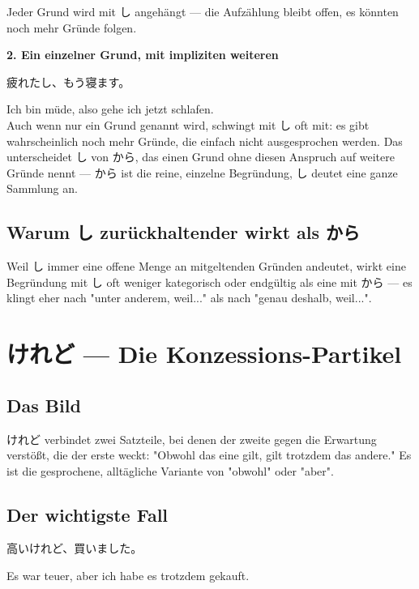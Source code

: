 \documentclass[12pt]{book}
\begin{document}
Jeder Grund wird mit し angehängt — die Aufzählung bleibt offen, es könnten noch mehr Gründe folgen.

\textbf{2. Ein einzelner Grund, mit impliziten weiteren}
\par\quad 疲れたし、もう寝ます。\\
\par\quad Ich bin müde, also gehe ich jetzt schlafen.\\

Auch wenn nur ein Grund genannt wird, schwingt mit し oft mit: es gibt wahrscheinlich noch mehr Gründe, die einfach nicht ausgesprochen werden. Das unterscheidet し von から, das einen Grund ohne diesen Anspruch auf weitere Gründe nennt — から ist die reine, einzelne Begründung, し deutet eine ganze Sammlung an.

\section*{Warum し zurückhaltender wirkt als から}

Weil し immer eine offene Menge an mitgeltenden Gründen andeutet, wirkt eine Begründung mit し oft weniger kategorisch oder endgültig als eine mit から — es klingt eher nach "unter anderem, weil..." als nach "genau deshalb, weil...".


\chapter{けれど — Die Konzessions-Partikel}

\section*{Das Bild}

けれど verbindet zwei Satzteile, bei denen der zweite gegen die Erwartung verstößt, die der erste weckt: "Obwohl das eine gilt, gilt trotzdem das andere." Es ist die gesprochene, alltägliche Variante von "obwohl" oder "aber".

\section*{Der wichtigste Fall}

\par\quad 高いけれど、買いました。\\
\par\quad Es war teuer, aber ich habe es trotzdem gekauft.\\
\end{document}
